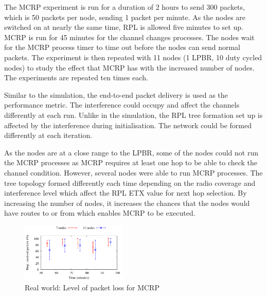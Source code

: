 The MCRP experiment is run for a duration of 2 hours to send 300 packets, which is 50 packets per node, sending 1 packet per minute. As the nodes are switched on at nearly the same time, RPL is allowed five minutes to set up. MCRP is run for 45 minutes for the channel changes processes. The nodes wait for the MCRP process timer to time out before the nodes can send normal packets. The experiment is then repeated with 11 nodes (1 LPBR, 10 duty cycled nodes) to study the effect that MCRP has with the increased number of nodes. The experiments are repeated ten times each. %



Similar to the simulation, the end-to-end packet delivery is used as the performance metric.
The interference could occupy and affect the channels differently at each run. Unlike in the simulation, the RPL tree formation set up is affected by the interference during initialisation. The network could be formed differently at each iteration.

As the nodes are at a close range to the LPBR, some of the nodes could not run the MCRP processes as MCRP requires at least one hop to be able to check the channel condition. However, several nodes were able to run MCRP processes. The tree topology formed differently each time depending on the radio coverage and interference level which affect the RPL ETX value for next hop selection. By increasing the number of nodes, it increases the chances that the nodes would have routes to or from which enables MCRP to be executed.

\begin{figure}
\centering
\includegraphics[width=0.45\textwidth]{figures/allNodes.pdf}
\caption{Real world: Level of packet loss for MCRP}
\label{fig:hardware}
\end{figure}

